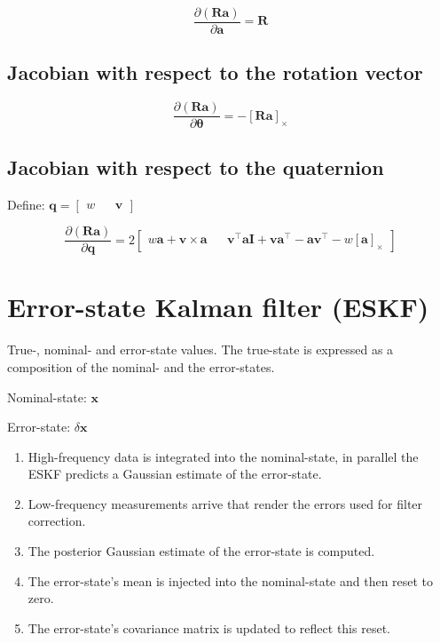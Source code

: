 \documentclass[11pt,a4paper]{scrartcl}
\renewcommand\vec{\bm}
\newcommand{\quat}[1]{\mathbf{#1}}
\newcommand{\Matrix}[1]{\mathbf{#1}}
\newcommand{\skewop}[1]{\left[ #1 \right]_\times}
\begin{document}
\begin{equation}
	\frac{\partial(\Matrix{R} \vec{a})}{\partial \vec{a}} = \Matrix{R}
\end{equation}

\subsection{Jacobian with respect to the rotation vector}

\begin{equation}
	\frac{\partial(\Matrix{R} \vec{a})}{\partial \vec{\theta}}
	=
	-\skewop{\Matrix{R} \vec{a}}
\end{equation}

\subsection{Jacobian with respect to the quaternion}

Define: $\quat{q} = \begin{bmatrix}w && \vec{v}\end{bmatrix}$

\begin{equation}
	\frac{\partial(\Matrix{R} \vec{a})}{\partial \quat{q}}
	=
	2 \begin{bmatrix}
		w \vec{a} + \vec{v} \times \vec{a} &&
		\vec{v}^\intercal \vec{a} \Matrix{I} + \vec{v} \vec{a}^\intercal - \vec{a} \vec{v}^\intercal - w \skewop{\vec{a}}
	\end{bmatrix}
\end{equation}

\section{Error-state Kalman filter (ESKF)}

True-, nominal- and error-state values. The true-state is expressed as a composition of the nominal- and the error-states.

Nominal-state: $\vec{x}$

Error-state: $\delta \vec{x}$

\begin{enumerate}
	\item High-frequency data is integrated into the nominal-state, in parallel the ESKF predicts a Gaussian estimate of the error-state.
	\item Low-frequency measurements arrive that render the errors used for filter correction.
	\item The posterior Gaussian estimate of the error-state is computed.
	\item The error-state's mean is injected into the nominal-state and then reset to zero.
	\item The error-state's covariance matrix is updated to reflect this reset.
\end{enumerate}
\end{document}
